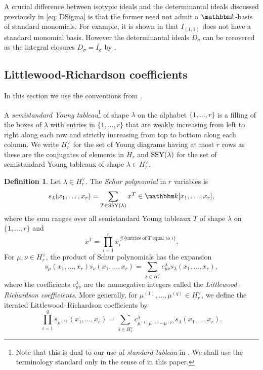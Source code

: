 \documentclass[11pt, reqno]{amsart}
\numberwithin{equation}{section}
\theoremstyle{definition}
\newtheorem{definition}[theorem]{Definition}
\newcommand{\kk}{{\mathbbm k}}
\renewcommand{\l}{\lambda}
\begin{document}
A crucial difference between isotypic ideals  and the determinantal ideals discussed previously in \eqref{eq: DSigma} is that the former need not admit a $\kk$-basis of standard monomials. For example, it is shown in  \cite[Example 11.8.5]{bruns2022determinants} that $I_{(1,1)}$ does not have a standard monomial basis. However  the determinantal ideals $D_\sigma$ can be recovered as the integral closures $D_\sigma=\overline{I_\sigma}$ by \cite{deconcini1980young}.

\subsection{Littlewood-Richardson coefficients}\label{s: Schur}

In this section we use the conventions from \cite{FULTON_TABLEAUX}.

A \textit{semistandard Young tableau}\footnote{Note that this is dual to our use of {\em standard tableau} in . We shall use the terminology standard only in the sense of  in this paper.} of shape $\lambda$ on the alphabet $\{1,\ldots,r\}$ is a filling of the boxes of $\lambda$ with entries in $\{1,\ldots,r\}$ that are weakly increasing from left to right along each row and strictly increasing from top to bottom along each column. We write $H_r^\vee$ for the set of Young diagrams having at most $r$ rows as these are the conjugates of elements in $H_r$ and ${\rm SSY}(\l)$ for the set of semistandard Young tableaux of shape $\l\in H_r^\vee$.

\begin{definition}
Let $\lambda\in H_r^\vee$. The \emph{Schur polynomial} in $r$ variables is
\[
s_\lambda(x_1,\ldots,x_r)=\sum_{T\in {\rm SSY}(\l)} x^T\in\kk[x_1,\ldots,x_r],
\]
where the sum ranges over all semistandard Young tableaux $T$ of shape $\lambda$ on $\{1,\ldots,r\}$ and
\[
x^T=\prod_{i=1}^r x_i^{\,\#\{\text{entries of $T$ equal to $i$}\}}.
\]
For $\mu,\nu\in H_r^\vee$, the product of Schur polynomials has the expansion
\begin{equation}\label{eq: Schur}
s_\mu(x_1,\ldots,x_r)s_\nu(x_1,\ldots,x_r)
=\sum_{\lambda\in H_r^\vee} c_{\mu\nu}^{\lambda}s_\lambda(x_1,\ldots,x_r),
\end{equation}
where the coefficients $c_{\mu\nu}^{\lambda}$ are the nonnegative integers called the \emph{Littlewood--Richardson coefficients}. More generally, for $\mu^{(1)},\ldots,\mu^{(q)}\in H_r^\vee$, we define the iterated Littlewood--Richardson coefficients by
\begin{equation}\label{eq: iterated Schur}
\prod_{i=1}^q s_{\mu^{(i)}}(x_1,\ldots,x_r)
=\sum_{\lambda\in H_r^\vee}
c_{\mu^{(1)}\mu^{(2)}\cdots\mu^{(q)}}^{\lambda}
s_\lambda(x_1,\ldots,x_r).
\end{equation}
\end{definition}
\end{document}

